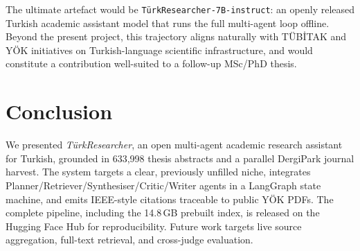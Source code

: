 \documentclass[conference]{IEEEtran}
\begin{document}
The ultimate artefact would be \texttt{T\"urkResearcher-7B-instruct}: an
openly released Turkish academic assistant model that runs the full
multi-agent loop offline. Beyond the present project, this trajectory aligns
naturally with TÜBİTAK and YÖK initiatives on Turkish-language scientific
infrastructure, and would constitute a contribution well-suited to a
follow-up MSc/PhD thesis.

\section{Conclusion}

We presented \textit{T\"urkResearcher}, an open multi-agent academic research
assistant for Turkish, grounded in 633{,}998 thesis abstracts and a parallel
DergiPark journal harvest. The system targets a clear, previously unfilled
niche, integrates Planner/Retriever/Synthesiser/Critic/Writer agents in a
LangGraph state machine, and emits IEEE-style citations traceable to public
YÖK PDFs. The complete pipeline, including the 14.8\,GB prebuilt index, is
released on the Hugging Face Hub for reproducibility. Future work targets
live source aggregation, full-text retrieval, and cross-judge evaluation.



\end{document}
